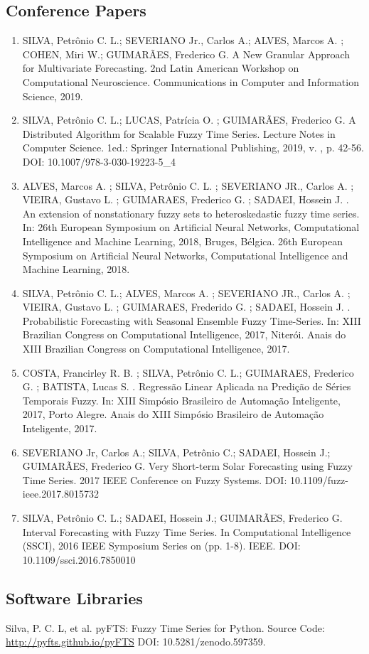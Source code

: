 \subsection{Conference Papers}
\begin{enumerate}
\item SILVA, Petrônio C. L.; SEVERIANO Jr., Carlos A.; ALVES, Marcos A. ; COHEN, Miri W.; GUIMARÃES, Frederico G. A New Granular Approach for Multivariate Forecasting. 2nd Latin American Workshop on Computational Neuroscience. Communications in Computer and Information Science, 2019.
\item SILVA, Petrônio C. L.; LUCAS, Patrícia O. ; GUIMARÃES, Frederico G. A Distributed Algorithm for Scalable Fuzzy Time Series. Lecture Notes in Computer Science. 1ed.: Springer International Publishing, 2019, v. , p. 42-56. DOI: 10.1007/978-3-030-19223-5\_4
\item ALVES, Marcos A. ; SILVA, Petrônio C. L. ; SEVERIANO JR., Carlos A. ; VIEIRA, Gustavo L. ; GUIMARAES, Frederico G. ; SADAEI, Hossein J. . An extension of nonstationary fuzzy sets to heteroskedastic fuzzy time series. In: 26th European Symposium on Artificial Neural Networks, Computational Intelligence and Machine Learning, 2018, Bruges, Bélgica. 26th European Symposium on Artificial Neural Networks, Computational Intelligence and Machine Learning, 2018.
\item SILVA, Petrônio C. L.; ALVES, Marcos A. ; SEVERIANO JR., Carlos A. ; VIEIRA, Gustavo L. ; GUIMARAES, Frederido G. ; SADAEI, Hossein J. . Probabilistic Forecasting with Seasonal Ensemble Fuzzy Time-Series. In: XIII Brazilian Congress on Computational Intelligence, 2017, Niterói. Anais do XIII Brazilian Congress on Computational Intelligence, 2017.
\item COSTA, Francirley R. B. ; SILVA, Petrônio C. L.; GUIMARAES, Frederico G. ; BATISTA, Lucas S. . Regressão Linear Aplicada na Predição de Séries Temporais Fuzzy. In: XIII Simpósio Brasileiro de Automação Inteligente, 2017, Porto Alegre. Anais do XIII Simpósio Brasileiro de Automação Inteligente, 2017. 
\item SEVERIANO Jr, Carlos A.; SILVA, Petrônio C.; SADAEI, Hossein J.; GUIMARÃES, Frederico G. Very Short-term Solar Forecasting using Fuzzy Time Series. 2017 IEEE Conference on Fuzzy Systems. DOI: 10.1109/fuzz-ieee.2017.8015732
\item SILVA, Petrônio C. L.; SADAEI, Hossein J.; GUIMARÃES, Frederico G. Interval Forecasting with Fuzzy Time Series. In Computational Intelligence (SSCI), 2016 IEEE Symposium Series on (pp. 1-8). IEEE. DOI: 10.1109/ssci.2016.7850010
\end{enumerate}

\subsection{Software Libraries}

Silva, P. C. L, et al. pyFTS: Fuzzy Time Series for Python. Source Code: \url{http://pyfts.github.io/pyFTS} DOI: 10.5281/zenodo.597359. 



